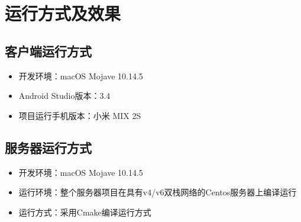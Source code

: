 \chapter{运行方式及效果}

\section{客户端运行方式}
\begin{itemize}
    \item 开发环境：macOS Mojave 10.14.5
    \item Android Studio版本：3.4
    \item 项目运行手机版本：小米 MIX 2S
\end{itemize}

\section{服务器运行方式}
\begin{itemize}
    \item 开发环境：macOS Mojave 10.14.5
    \item 运行环境：整个服务器项目在具有v4/v6双栈网络的Centos服务器上编译运行
    \item 运行方式：采用Cmake编译运行方式
\end{itemize}

\newpage
